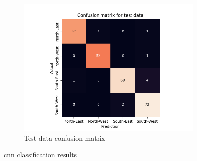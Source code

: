 \documentclass[10pt,twocolumn,letterpaper]{article}
\begin{document}
\begin{figure}
\begin{subfigure}{0.33\linewidth}
    \includegraphics[width=\linewidth, trim={7em, 0em, 9em, 5em}, clip]{cnn_cfsn_test}
    \caption{Test data confusion matrix}
    \label{fig:cnn_test}
  \end{subfigure}
  \caption{\acrshort{cnn} classification results}
  \label{fig:cnn_res}
\end{figure}
\end{document}
